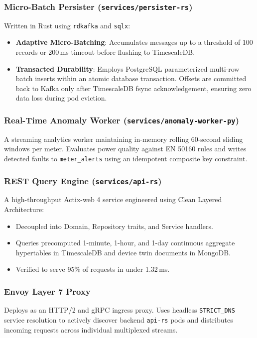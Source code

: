 \documentclass[11pt,a4paper]{article}
\begin{document}
\subsubsection{Micro-Batch Persister (\texttt{services/persister-rs})}
Written in Rust using \texttt{rdkafka} and \texttt{sqlx}:
\begin{itemize}
    \item \textbf{Adaptive Micro-Batching}: Accumulates messages up to a threshold of 100 records or 200\,ms timeout before flushing to TimescaleDB.
    \item \textbf{Transacted Durability}: Employs PostgreSQL parameterized multi-row batch inserts within an atomic database transaction. Offsets are committed back to Kafka only after TimescaleDB fsync acknowledgement, ensuring zero data loss during pod eviction.
\end{itemize}

\subsubsection{Real-Time Anomaly Worker (\texttt{services/anomaly-worker-py})}
A streaming analytics worker maintaining in-memory rolling 60-second sliding windows per meter. Evaluates power quality against EN 50160 rules and writes detected faults to \texttt{meter\_alerts} using an idempotent composite key constraint.

\subsubsection{REST Query Engine (\texttt{services/api-rs})}
A high-throughput Actix-web 4 service engineered using Clean Layered Architecture:
\begin{itemize}
    \item Decoupled into Domain, Repository traits, and Service handlers.
    \item Queries precomputed 1-minute, 1-hour, and 1-day continuous aggregate hypertables in TimescaleDB and device twin documents in MongoDB.
    \item Verified to serve 95\% of requests in under 1.32\,ms.
\end{itemize}

\subsubsection{Envoy Layer 7 Proxy}
Deploys as an HTTP/2 and gRPC ingress proxy. Uses headless \texttt{STRICT\_DNS} service resolution to actively discover backend \texttt{api-rs} pods and distributes incoming requests across individual multiplexed streams.
\end{document}
